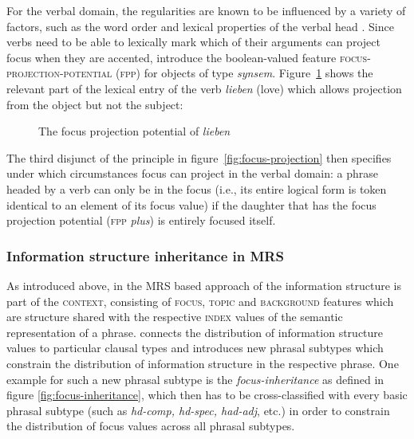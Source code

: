 \documentclass[output=paper]{langsci/langscibook}
\begin{document}
For the verbal domain, the regularities are known to be influenced by
a variety of factors, such as the word order and lexical properties of
the verbal head \citep[cf., e.g., ][]{vSU86a}.  Since verbs
need to be able to lexically mark which of their arguments can project
focus when they are accented, \cite{dKM2003a} introduce the boolean-valued feature
\textsc{focus-projection-potential (fpp)} for objects of type
\textit{synsem}.  Figure~\ref{fig:fpp-lieben} shows the relevant part
of the lexical entry of the verb \textit{lieben} (love) which allows
projection from the object but not the subject:
\begin{figure}[htb!]

\begin{center}
  \begin{avm}
  \end{avm}
\caption{The focus projection potential of \textit{lieben}}
\label{fig:fpp-lieben}
\end{center}\unskip
\end{figure}

The third disjunct of the principle in
figure~\ref{fig:focus-projection} then specifies under which circumstances
focus can project in the verbal domain: a phrase headed by a verb can
only be in the focus (i.e., its entire logical form is token identical
to an element of its focus value) if the daughter that has the focus
projection potential (\textsc{fpp} \textit{plus}) is entirely focused
itself.


\subsubsection{Information structure inheritance in MRS}

As introduced above, in the MRS based approach of \cite{Paggio2009a-u} the
information structure is part of the \textsc{context}, consisting of
\textsc{focus}, \textsc{topic} and \textsc{background} features which
are structure shared with the respective \textsc{index} values of the
semantic representation of a phrase. \cite{Paggio2009a-u} connects the
distribution of information structure values to particular clausal
types and introduces new phrasal subtypes which constrain the
distribution of information structure in the respective phrase. One
example for such a new phrasal subtype is the
\textit{focus-inheritance} as defined in figure
\ref{fig:focus-inheritance}, which then has to be cross-classified
with every basic phrasal subtype (such as \textit{hd-comp, hd-spec,
  had-adj}, etc.) in order to constrain the distribution of focus
values across all phrasal subtypes.
\end{document}

